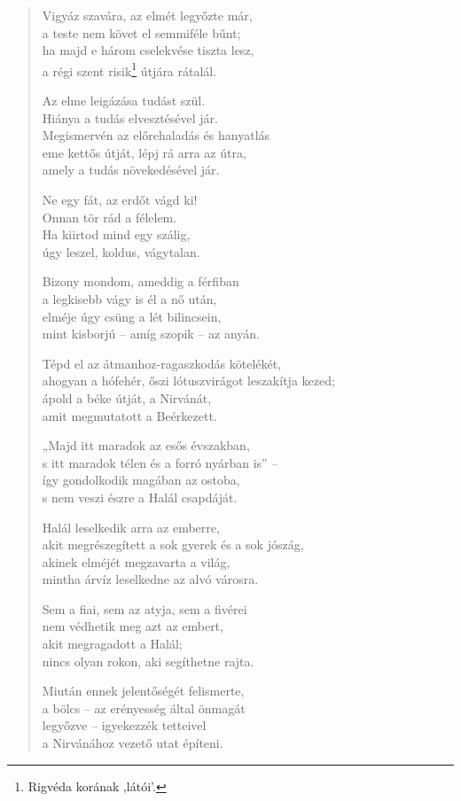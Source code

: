 \begin{verse}
 Vigyáz szavára, az elmét legyőzte már,\\
a teste nem követ el semmiféle bűnt;\\
ha majd e három cselekvése tiszta lesz,\\
a régi szent risik\footnote{Rigvéda korának ‚látói’.} útjára rátalál.

 Az elme leigázása tudást szül.\\
Hiánya a tudás elvesztésével jár.\\
Megismervén az előrehaladás és hanyatlás\\
eme kettős útját, lépj rá arra az útra,\\
amely a tudás növekedésével jár.

 Ne egy fát, az erdőt vágd ki!\\
Onnan tör rád a félelem.\\
Ha kiirtod mind egy szálig,\\
úgy leszel, koldus, vágytalan.

 Bizony mondom, ameddig a férfiban\\
a legkisebb vágy is él a nő után,\\
elméje úgy csüng a lét bilincsein,\\
mint kisborjú – amíg szopik – az anyán.

 Tépd el az átmanhoz-ragaszkodás kötelékét,\\
ahogyan a hófehér, őszi lótuszvirágot leszakítja kezed;\\
ápold a béke útját, a Nirvánát,\\
amit megmutatott a Beérkezett.

 „Majd itt maradok az esős évszakban,\\
s itt maradok télen és a forró nyárban is” –\\
így gondolkodik magában az ostoba,\\
s nem veszi észre a Halál csapdáját.

 Halál leselkedik arra az emberre,\\
akit megrészegített a sok gyerek és a sok jószág,\\
akinek elméjét megzavarta a világ,\\
mintha árvíz leselkedne az alvó városra.

 Sem a fiai, sem az atyja, sem a fivérei\\
nem védhetik meg azt az embert,\\
akit megragadott a Halál;\\
nincs olyan rokon, aki segíthetne rajta.

 Miután ennek jelentőségét felismerte,\\
a bölcs  – az erényesség által önmagát\\
legyőzve – igyekezzék tetteivel\\
a Nirvánához vezető utat építeni.

\end{verse}
